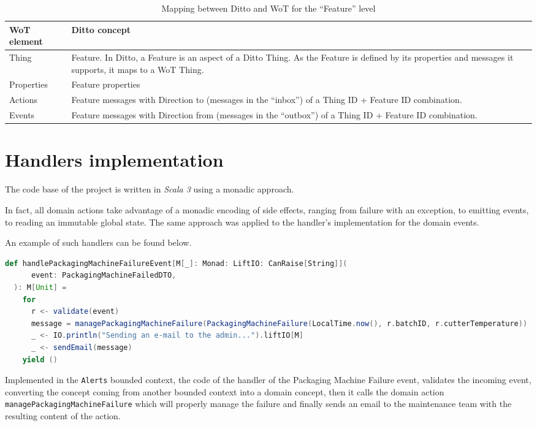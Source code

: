 \begin{table}[H]
    \begin{tabular}{|p{}|p{}|}
    \hline
    \textbf{WoT element} & \textbf{Ditto concept} \\ \hline
    Thing & Feature. In Ditto, a Feature is an aspect of a Ditto Thing. As the Feature is defined by its properties and messages it supports, it maps to a WoT Thing. \\ \hline
    Properties & Feature properties \\ \hline
    Actions &	Feature messages with Direction to (messages in the “inbox”) of a Thing ID + Feature ID combination. \\ \hline
    Events &	Feature messages with Direction from (messages in the “outbox”) of a Thing ID + Feature ID combination. \\ \hline
    \end{tabular}
    \caption{Mapping between Ditto and WoT for the ``Feature'' level}
    \label{tab:ditto-wot-feature}
\end{table}

\section{Handlers implementation}
The code base of the project is written in \textit{Scala 3} using a monadic approach.

In fact, all domain actions take advantage of a monadic encoding of side effects, ranging from failure with an exception, to emitting events, to reading an immutable global state.
The same approach was applied to the handler's implementation for the domain events.

An example of such handlers can be found below.

\begin{lstlisting}[language=Scala]
  def handlePackagingMachineFailureEvent[M[_]: Monad: LiftIO: CanRaise[String]](
      event: PackagingMachineFailedDTO,
  ): M[Unit] =
    for
      r <- validate(event)
      message = managePackagingMachineFailure(PackagingMachineFailure(LocalTime.now(), r.batchID, r.cutterTemperature))
      _ <- IO.println("Sending an e-mail to the admin...").liftIO[M]
      _ <- sendEmail(message)
    yield ()
\end{lstlisting}

Implemented in the \texttt{Alerts} bounded context, the code of the handler of the Packaging Machine Failure event, validates the incoming event, converting the concept coming from another bounded context into a domain concept, then it calls the domain action \texttt{managePackagingMachineFailure} which will properly manage the failure and finally sends an email to the maintenance team with the resulting content of the action.

